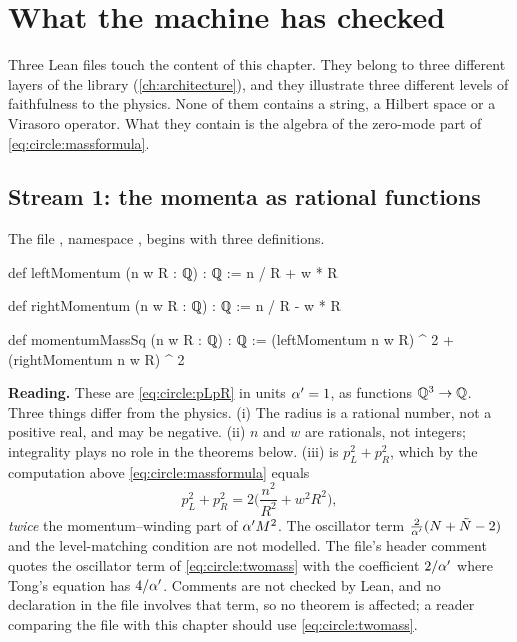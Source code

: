 \section{What the machine has checked}\label{sec:circle:lean}

Three Lean files touch the content of this chapter. They belong to three different layers of
the library (\cref{ch:architecture}), and they illustrate three different levels of
faithfulness to the physics. None of them contains a string, a Hilbert space or a Virasoro
operator. What they contain is the algebra of the zero-mode part of
\eqref{eq:circle:massformula}.

\subsection{Stream 1: the momenta as rational functions}

The file , namespace
, begins with three definitions.

\begin{leanbox}
\begin{leancode}
def leftMomentum (n w R : ℚ) : ℚ := n / R + w * R

def rightMomentum (n w R : ℚ) : ℚ := n / R - w * R

def momentumMassSq (n w R : ℚ) : ℚ :=
  (leftMomentum n w R) ^ 2 + (rightMomentum n w R) ^ 2
\end{leancode}
\textbf{Reading.} These are \eqref{eq:circle:pLpR} in units $\alpha'=1$, as functions
$\mathbb{Q}^3\to\mathbb{Q}$. Three things differ from the physics. (i) The radius is a rational number, not a
positive real, and may be negative. (ii) $n$ and $w$ are rationals, not integers; integrality
plays no role in the theorems below. (iii)  is $p_L^2+p_R^2$, which by
the computation above \eqref{eq:circle:massformula} equals
\[
 p_L^2+p_R^2=2\Big(\frac{n^2}{R^2}+w^2R^2\Big),
\]
\emph{twice} the momentum--winding part of $\alpha' M^2$. The oscillator term
$\frac2{\alpha'}(N+\tilde N-2)$ and the level-matching condition are not modelled. The file's header
comment quotes the oscillator term of \eqref{eq:circle:twomass} with the coefficient $2/\alpha'$
where Tong's equation has $4/\alpha'$. Comments are not checked by Lean, and no declaration in
the file involves that term, so no theorem is affected; a reader comparing the file with this
chapter should use \eqref{eq:circle:twomass}.
\end{leanbox}

